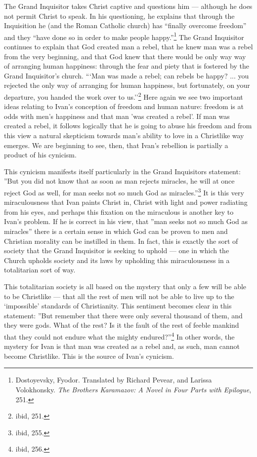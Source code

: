 The Grand Inquisitor takes Christ captive and questions him --- although he does not permit Christ to speak. In his questioning, he explains that through the Inquisition he (and the Roman Catholic church) has ``finally overcome freedom'' and they ``have done so in order to make people happy.''\footnote{Dostoyevsky, Fyodor. Translated by Richard Pevear, and Larissa Volokhonsky. \emph{The Brothers Karamazov: A Novel in Four Parts with Epilogue}, 251.} The Grand Inquisitor continues to explain that God created man a rebel, that he knew man was a rebel from the very beginning, and that God knew that there would be only way way of arranging human happiness: through the fear and piety that is fostered by the Grand Inquisitor's church. ```Man was made a rebel; can rebels be happy? ... you rejected the only way of arranging for human happiness, but fortunately, on your departure, you handed the work over to us.''\footnote{ibid, 251.} Here again we see two important ideas relating to Ivan's conception of freedom and human nature: freedom is at odds with men's happiness and that man 'was created a rebel'. If man was created a rebel, it follows logically that he is going to abuse his freedom and from this view a natural skepticism towards man's ability to love in a Christlike way emerges. We are beginning to see, then, that Ivan's rebellion is partially a product of his cynicism.

This cynicism manifests itself particularly in the Grand Inquisitors statement: ''But you did not know that as soon as man rejects miracles, he will at once reject God as well, for man seeks not so much God as miracles.''\footnote{ibid, 255.} It is this very miraculousness that Ivan paints Christ in, Christ with light and power radiating from his eyes, and perhaps this fixation on the miraculous is another key to Ivan's problem. If he is correct in his view, that ''man seeks not so much God as miracles'' there is a certain sense in which God can be proven to men and Christian morality can be instilled in them. In fact, this is exactly the sort of society that the Grand Inquisitor is seeking to uphold --- one in which the Church upholds society and its laws by upholding this miraculousness in a totalitarian sort of way.

This totalitarian society is all based on the mystery that only a few will be able to be Christlike --- that all the rest of men will not be able to live up to the `impossible' standards of Christianity. This sentiment becomes clear in this statement: ''But remember that there were only several thousand of them, and they were gods. What of the rest? Is it the fault of the rest of feeble mankind that they could not endure what the mighty endured?''\footnote{ibid, 256.} In other words, the mystery for Ivan is that man was created as a rebel and, as such, man cannot become Christlike. This is the source of Ivan's cynicism.

